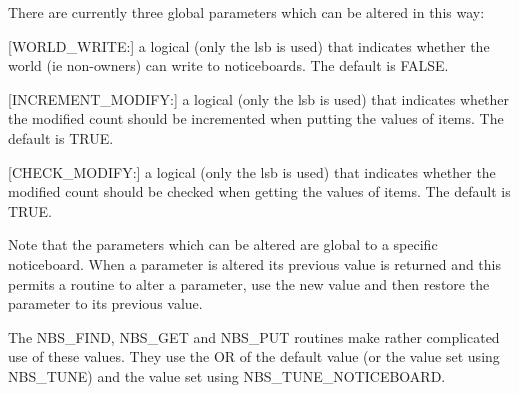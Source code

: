 \begin{small}
{{      There are currently three global parameters which can be altered in
      this way:

      [WORLD\_WRITE:] a logical (only the lsb is used) that indicates whether
         the world (ie non-owners) can write to noticeboards. The default is
         FALSE.

      [INCREMENT\_MODIFY:] a logical (only the lsb is used) that indicates
         whether the modified count should be incremented when putting the
         values of items. The default is TRUE.

      [CHECK\_MODIFY:] a logical (only the lsb is used) that indicates whether
         the modified count should be checked when getting the values of items.
         The default is TRUE.

      Note that the parameters which can be altered are global to a specific
      noticeboard. When a parameter is altered its previous value is returned
      and this permits a routine to alter a parameter, use the new value and
      then restore the parameter to its previous value.

      The NBS\_FIND, NBS\_GET and NBS\_PUT routines make rather complicated use of
      these values. They use the OR of the default value (or the value set
      using NBS\_TUNE) and the value set using NBS\_TUNE\_NOTICEBOARD.

}}
\end{small}

